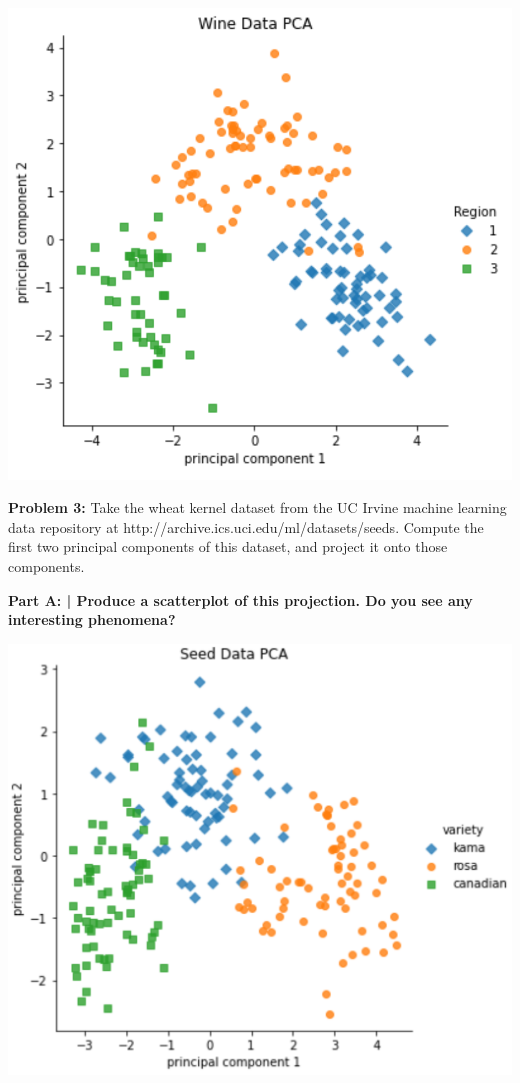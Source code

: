 \documentclass{article}
\begin{document}
 \includegraphics[scale=1]{HW9_4.PNG}\newline
 
 \newpage

 \begin{center}
      \Large\textbf{Problem 3:} Take the wheat kernel dataset from the UC Irvine machine learning data repository at http://archive.ics.uci.edu/ml/datasets/seeds. Compute the first two principal components of this dataset, and project it onto those components.
      \par
 \end{center}

 \textbf{Part A: | Produce a scatterplot of this projection. Do you see any interesting phenomena?}\newline
 
 \includegraphics[scale=1]{HW9_5.PNG}\newline
 
\end{document}
